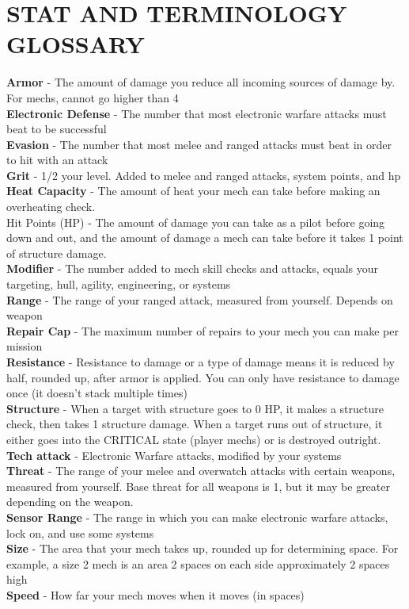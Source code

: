 \section{STAT AND TERMINOLOGY GLOSSARY}

\textbf{Armor} - The amount of damage you reduce all incoming sources of damage by. For mechs, cannot go higher than 4\\
\textbf{Electronic Defense} - The number that most electronic warfare attacks must beat to be successful\\
\textbf{Evasion} - The number that most melee and ranged attacks must beat in order to hit with an attack\\
\textbf{Grit} - 1/2 your level. Added to melee and ranged attacks, system points, and hp\\
\textbf{Heat Capacity} - The amount of heat your mech can take before making an overheating check.\\
Hit Points (HP) - The amount of damage you can take as a pilot before going down and out, and the amount of damage a mech can take before it takes 1 point of structure damage.\\
\textbf{Modifier} - The number added to mech skill checks and attacks, equals your targeting, hull, agility, engineering, or systems\\
\textbf{Range} - The range of your ranged attack, measured from yourself. Depends on weapon\\
\textbf{Repair Cap} - The maximum number of repairs to your mech you can make per mission\\
\textbf{Resistance} - Resistance to damage or a type of damage means it is reduced by half, rounded up, after armor is applied. You can only have resistance to damage once (it doesn’t stack multiple times)\\
\textbf{Structure} - When a target with structure goes to 0 HP, it makes a structure check, then takes 1 structure damage. When a target runs out of structure, it either goes into the CRITICAL state (player mechs) or is destroyed outright.\\
\textbf{Tech attack} - Electronic Warfare attacks, modified by your systems\\
\textbf{Threat} - The range of your melee and overwatch attacks with certain weapons, measured from yourself. Base threat for all weapons is 1, but it may be greater depending on the weapon.\\
\textbf{Sensor Range} - The range in which you can make electronic warfare attacks, lock on, and use some systems\\
\textbf{Size} - The area that your mech takes up, rounded up for determining space. For example, a size 2 mech is an area 2 spaces on each side approximately 2 spaces high\\
\textbf{Speed} - How far your mech moves when it moves (in spaces)